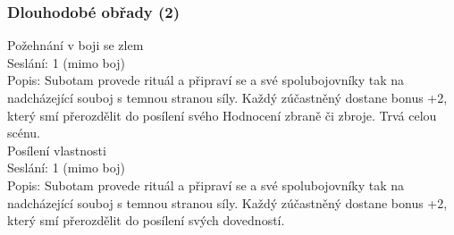 \documentclass[../main.tex]{subfiles}
\begin{document}
\subsubsection{Dlouhodobé obřady (2)}


Požehnání v boji se zlem\\
Seslání: 1 (mimo boj)\\
Popis: Subotam provede rituál a připraví se a své spolubojovníky tak na nadcházející souboj s temnou stranou síly.  Každý zúčastněný dostane bonus +2, který smí přerozdělit do posílení svého Hodnocení zbraně či zbroje. Trvá celou scénu. \\


Posílení vlastnosti\\
Seslání: 1 (mimo boj)\\
Popis: Subotam provede rituál a připraví se a své spolubojovníky tak na nadcházející souboj s temnou stranou síly. Každý zúčastněný dostane bonus +2, který smí přerozdělit do posílení svých dovedností. \\
\end{document}
